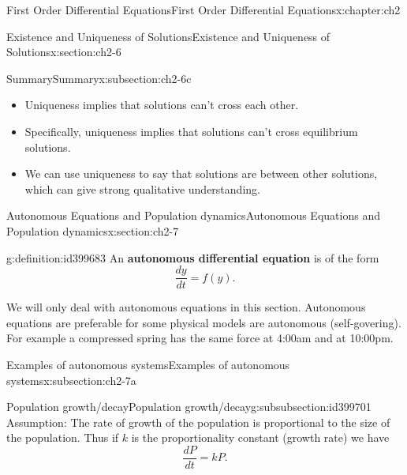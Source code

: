 \documentclass[oneside,10pt,]{book}
\newcommand{\terminology}[1]{\textbf{#1}}
\numberwithin{equation}{section}
\numberwithin{equation}{section}
\begin{document}
\begin{chapterptx}{First Order Differential Equations}{}{First Order Differential Equations}{}{}{x:chapter:ch2}
\begin{sectionptx}{Existence and Uniqueness of Solutions}{}{Existence and Uniqueness of Solutions}{}{}{x:section:ch2-6}
\begin{subsectionptx}{Summary}{}{Summary}{}{}{x:subsection:ch2-6c}
\begin{itemize}[label=\textbullet]
\item{}Uniqueness implies that solutions can't cross each other.%
\item{}Specifically, uniqueness implies that solutions can't cross equilibrium solutions.%
\item{}We can use uniqueness to say that solutions are between other solutions, which can give strong qualitative understanding.%
\end{itemize}
\end{subsectionptx}
\end{sectionptx}
%
%
\typeout{************************************************}
\typeout{************************************************}
%
\begin{sectionptx}{Autonomous Equations and Population dynamics}{}{Autonomous Equations and Population dynamics}{}{}{x:section:ch2-7}
\begin{introduction}{}%
\begin{definition}{}{g:definition:id399683}%
An \terminology{autonomous differential equation} is of the form%
\begin{equation*}
\frac{dy}{dt}=f(y).
\end{equation*}
%
\end{definition}
We will only deal with autonomous equations in this section. Autonomous equations are preferable for some physical models are autonomous (self-govering). For example a compressed spring has the same force at 4:00am and at 10:00pm.%
\end{introduction}%
%
%
\typeout{************************************************}
\typeout{************************************************}
%
\begin{subsectionptx}{Examples of autonomous systems}{}{Examples of autonomous systems}{}{}{x:subsection:ch2-7a}
%
%
\typeout{************************************************}
\typeout{************************************************}
%
\begin{subsubsectionptx}{Population growth\slash{}decay}{}{Population growth\slash{}decay}{}{}{g:subsubsection:id399701}
Assumption: The rate of growth of the population is proportional to the size of the population. Thus if \(k\) is the proportionality constant (growth rate) we have%
\begin{equation*}
\frac{dP}{dt}=kP.
\end{equation*}

\end{subsubsectionptx}
\end{subsectionptx}
\end{sectionptx}
\end{chapterptx}
\end{document}
